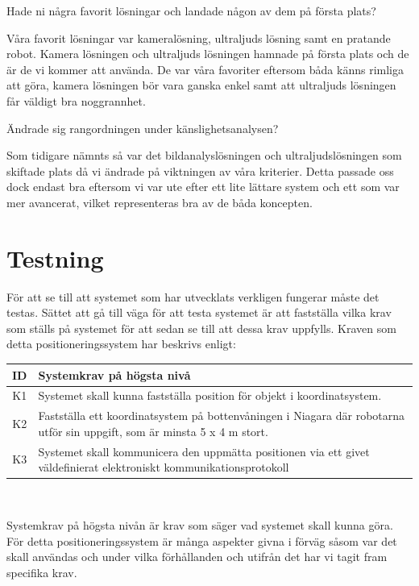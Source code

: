 \documentclass[11pt, a4paper]{report}
\begin{document}
Hade ni några favorit lösningar och landade någon av dem på första plats?

Våra favorit lösningar var kameralösning, ultraljuds lösning samt en pratande robot. Kamera lösningen och ultraljuds lösningen hamnade på första plats och de är de vi kommer att använda. De var våra favoriter eftersom båda känns rimliga att göra, kamera lösningen bör vara ganska enkel samt att ultraljuds lösningen får väldigt bra noggrannhet.

Ändrade sig rangordningen under känslighetsanalysen?

Som tidigare nämnts så var det bildanalyslösningen och ultraljudslösningen som skiftade plats då vi ändrade på viktningen av våra kriterier. Detta passade oss dock endast bra eftersom vi var ute efter ett lite lättare system och ett som var mer avancerat, vilket representeras bra av de båda koncepten. 


\section{Testning}
För att se till att systemet som har utvecklats verkligen fungerar måste det testas. Sättet att gå till väga för att testa systemet är att fastställa vilka krav som ställs på systemet för att sedan se till att dessa krav uppfylls. Kraven som detta positioneringssystem har beskrivs enligt:

\begin{center}
	\begin{tabular}{c | p{13.5cm}}
	ID & Systemkrav på högsta nivå \\ \hline
	K1 & Systemet skall kunna fastställa position för objekt i koordinatsystem. \\
	K2 & Fastställa ett koordinatsystem på bottenvåningen i Niagara där robotarna utför sin uppgift, som är minsta 5 x 4 m stort. \\
	K3 & Systemet skall kommunicera den uppmätta positionen via ett givet väldefinierat elektroniskt kommunikationsprotokoll \\
	\end{tabular}
	\\ [0.5cm]
\end{center}

	Systemkrav på högsta nivån är krav som säger vad systemet skall kunna göra. För detta positioneringssystem är många aspekter givna i förväg såsom var det skall användas och under vilka förhållanden och utifrån det har vi tagit fram specifika krav.
	
\end{document}
